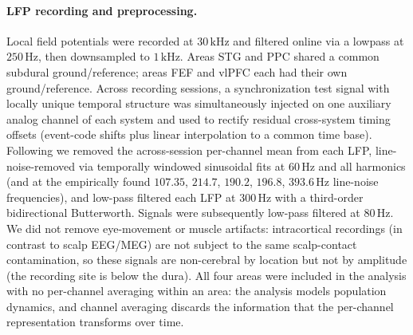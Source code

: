 \paragraph{LFP recording and preprocessing.} Local field potentials were recorded at $30\,\mathrm{kHz}$ and filtered online via a lowpass at $250\,\mathrm{Hz}$, then downsampled to $1\,\mathrm{kHz}$. Areas STG and PPC shared a common subdural ground/reference; areas FEF and vlPFC each had their own ground/reference. Across recording sessions, a synchronization test signal with locally unique temporal structure was simultaneously injected on one auxiliary analog channel of each system and used to rectify residual cross-system timing offsets (event-code shifts plus linear interpolation to a common time base). Following \cite{Eisen2024-vc} we removed the across-session per-channel mean from each LFP, line-noise-removed via temporally windowed sinusoidal fits at $60\,\mathrm{Hz}$ and all harmonics (and at the empirically found $107.35$, $214.7$, $190.2$, $196.8$, $393.6\,\mathrm{Hz}$ line-noise frequencies), and low-pass filtered each LFP at $300\,\mathrm{Hz}$ with a third-order bidirectional Butterworth. Signals were subsequently low-pass filtered at $80\,\mathrm{Hz}$. We did not remove eye-movement or muscle artifacts: intracortical recordings (in contrast to scalp EEG/MEG) are not subject to the same scalp-contact contamination, so these signals are non-cerebral by location but not by amplitude (the recording site is below the dura). All four areas were included in the analysis with no per-channel averaging within an area: the analysis models population dynamics, and channel averaging discards the information that the per-channel representation transforms over time.

